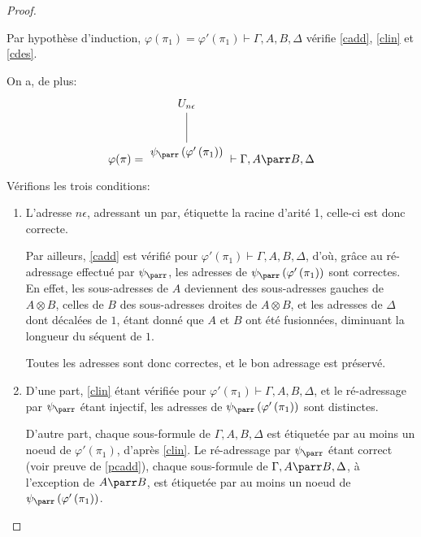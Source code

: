 \documentclass[11pt,a4paper]{article}
\theoremstyle{plain}
\theoremstyle{definition}
\theoremstyle{remark}
\newcommand*{\tensor}{\otimes}
\newcommand*{\someproof}{\pi}
\newcommand*{\sequent}{\Gamma}
\newcommand*{\encode}{\ensuremath{\varphi}}
\begin{document}
\begin{proof}
\begin{description}
    Par hypothèse d'induction, $\encode \left( \pi_1 \right) = \encode ' \left( \pi_1 \right) \vdash \sequent, A, B, \Delta$ vérifie \ref{cadd}, \ref{clin} et \ref{cdes}.
    
    On a, de plus:
    \begin{equation*}
    \encode ( \someproof ) = \begin{tikzpicture}%
    [level distance=1.5cm,
    level 2/.style={sibling distance=3.5cm}]
    \node {$U_{n \epsilon}$}
        child {node {$\psi_\parr \left( \encode' \left( \pi_1 \right) \right)$}
    };
    \end{tikzpicture} \vdash \sequent, A \parr B, \Delta
    \end{equation*}

    Vérifions les trois conditions:
    \begin{enumerate}
        \item\label{pcadd} L'adresse $n \epsilon$, adressant un par, étiquette la racine d'arité 1, celle-ci est donc correcte.
        
        Par ailleurs, \ref{cadd} est vérifié pour $\encode ' \left( \pi_1 \right) \vdash \sequent, A, B, \Delta$, d'où, grâce au ré-adressage effectué par $\psi_\parr$, les adresses de $\psi_\parr \left( \encode' \left( \pi_1 \right) \right)$ sont correctes. En effet, les sous-adresses de $A$ deviennent des sous-adresses gauches de $A \tensor B$, celles de $B$ des sous-adresses droites de $A \tensor B$, et les adresses de $\Delta$ dont décalées de $1$, étant donné que $A$ et $B$ ont été fusionnées, diminuant la longueur du séquent de $1$.
        
        Toutes les adresses sont donc correctes, et le bon adressage est préservé.
        
        \item D'une part, \ref{clin} étant vérifiée pour $\encode ' \left( \pi_1 \right) \vdash \sequent, A, B, \Delta$, et le ré-adressage par $\psi_\parr$ étant injectif, les adresses de $\psi_\parr \left( \encode' \left( \pi_1 \right) \right)$ sont distinctes.
        
        D'autre part, chaque sous-formule de $\sequent, A, B, \Delta$ est étiquetée par au moins un noeud de $\encode ' \left( \pi_1 \right)$, d'après \ref{clin}. Le ré-adressage par $\psi_\parr$ étant correct (voir preuve de \ref{pcadd}), chaque sous-formule de $\sequent, A \parr B, \Delta$, à l'exception de $A \parr B$, est étiquetée par au moins un noeud de $\psi_\parr \left( \encode' \left( \pi_1 \right) \right)$.
        

\end{enumerate}
\end{description}
\end{proof}
\end{document}

